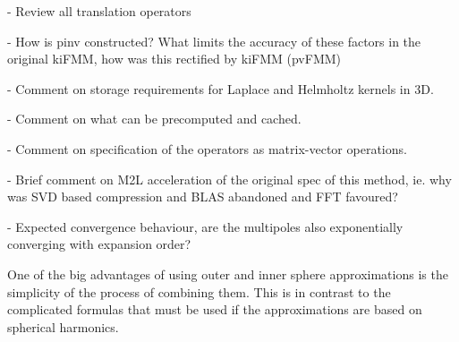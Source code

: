 - Review all translation operators

- How is pinv constructed? What limits the accuracy of these factors in the original kiFMM, how was this rectified by kiFMM (pvFMM)

- Comment on storage requirements for Laplace and Helmholtz kernels in 3D.

- Comment on what can be precomputed and cached.

- Comment on specification of the operators as matrix-vector operations.

- Brief comment on M2L acceleration of the original spec of this method, ie. why was SVD based compression and BLAS abandoned and FFT favoured?

- Expected convergence behaviour, are the multipoles also exponentially converging with expansion order?

One of the big advantages of using outer and inner sphere approximations is the simplicity of the process of combining them. This is in contrast to the complicated formulas that must be used if the approximations are based on spherical harmonics.